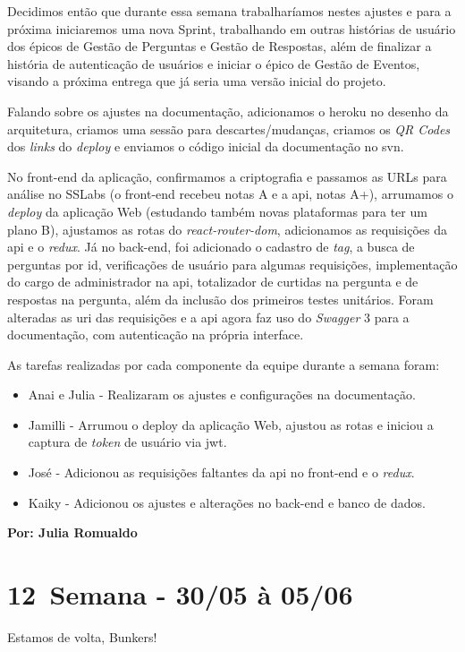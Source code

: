 Decidimos então que durante essa semana trabalharíamos nestes ajustes e para a próxima iniciaremos uma nova \gls{Sprint}, trabalhando em outras histórias de usuário dos épicos de Gestão de Perguntas e Gestão de Respostas, além de finalizar a história de autenticação de usuários e iniciar o épico de Gestão de Eventos, visando a próxima entrega que já seria uma versão inicial do projeto. 

Falando sobre os ajustes na documentação, adicionamos o \gls{heroku} no desenho da arquitetura, criamos uma sessão para descartes/mudanças, criamos os \textit{QR Codes} dos \textit{links} do \textit{deploy} e enviamos o código inicial da documentação no \gls{svn}. 

No \gls{front-end} da aplicação, confirmamos a criptografia e passamos as URLs para análise no SSLabs (o \gls{front-end} recebeu notas A e a \acs{api}, notas A+), arrumamos o \textit{deploy} da aplicação Web (estudando também novas plataformas para ter um plano B), ajustamos as rotas do \textit{react-router-dom}, adicionamos as requisições da \acs{api} e o \textit{redux}. Já no \gls{back-end}, foi adicionado o cadastro de \textit{tag}, a busca de perguntas por id, verificações de usuário para algumas requisições, implementação do cargo de administrador na \acs{api}, totalizador de curtidas na pergunta e de respostas na pergunta, além da inclusão dos primeiros testes unitários. Foram alteradas as \acs{uri} das requisições e a \acs{api} agora faz uso do \textit{Swagger} 3 para a documentação, com autenticação na própria interface.

As tarefas realizadas por cada componente da equipe durante a semana foram:
\begin{itemize}
    \item Anai e Julia - Realizaram os ajustes e configurações na documentação.
    \item Jamilli - Arrumou o deploy da aplicação Web, ajustou as rotas e iniciou a captura de \textit{token} de usuário via \acs{jwt}.
    \item José - Adicionou as requisições faltantes da \acs{api} no \gls{front-end} e o \textit{redux}.
    \item Kaiky - Adicionou os ajustes e alterações no \gls{back-end} e banco de dados. 
\end{itemize}

\textbf{Por: Julia Romualdo}

\section{12\textordfeminine \, Semana - 30/05 à 05/06}
Estamos de volta, Bunkers!

